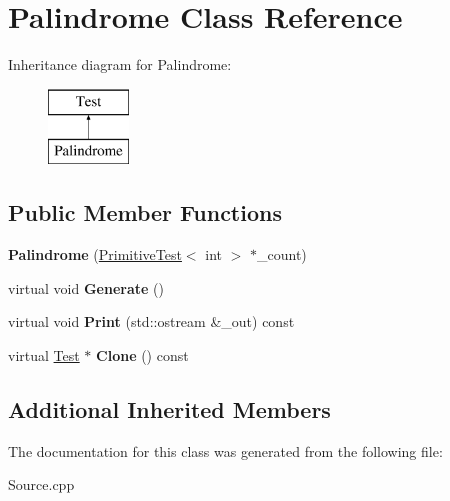 \hypertarget{class_palindrome}{}\section{Palindrome Class Reference}
\label{class_palindrome}
Inheritance diagram for Palindrome\+:\begin{figure}[H]
\begin{center}
\leavevmode
\includegraphics[height=2.000000cm]{class_palindrome}
\end{center}
\end{figure}
\subsection*{Public Member Functions}
\begin{DoxyCompactItemize}
\item 
\mbox{\label{class_palindrome_adfc7f126cd4cd25c0fad6b280c50a3b5}} 
{\bfseries Palindrome} (\hyperlink{class_primitive_test}{Primitive\+Test}$<$ int $>$ $\ast$\+\_\+count)
\item 
\mbox{\label{class_palindrome_a58fad4fabc60bed8450dd62d30b23862}} 
virtual void {\bfseries Generate} ()
\item 
\mbox{\label{class_palindrome_ae526b6957989ce2d073263e5e11d0f61}} 
virtual void {\bfseries Print} (std\+::ostream \&\+\_\+out) const
\item 
\mbox{\label{class_palindrome_abacf8a157ffb07913fa1300b02245634}} 
virtual \hyperlink{class_test}{Test} $\ast$ {\bfseries Clone} () const
\end{DoxyCompactItemize}
\subsection*{Additional Inherited Members}


The documentation for this class was generated from the following file\+:\begin{DoxyCompactItemize}
\item 
Source.\+cpp\end{DoxyCompactItemize}
